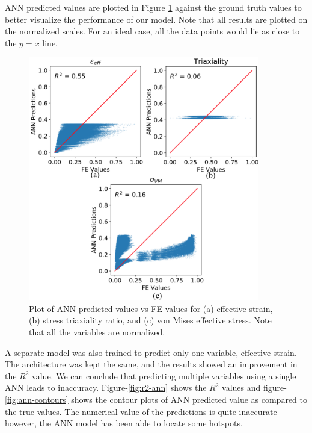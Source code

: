 ANN predicted values are plotted in Figure \ref{fig:exp_pred_ann} against the ground truth values to better visualize the performance of our model. Note that all results are plotted on the normalized scales. For an ideal case, all the data points would lie as close to the $y=x$ line.
\begin{figure}[!h]
	\centering
	\includegraphics[width=0.9\textwidth]{Pictures/ann-res/final-ann-bitmap.png}
	\hspace{1mm}
	\caption{Plot of ANN predicted values vs FE values for (a) effective strain, (b) stress triaxiality ratio, and (c) von Mises effective stress. Note that all the variables are normalized.} 
	\label{fig:exp_pred_ann}
\end{figure}
A separate model was also trained to predict only one variable, effective strain. The architecture was kept the same, and the results showed an improvement in the $R^2$ value. We can conclude that predicting multiple variables using a single ANN leads to inaccuracy. Figure-\ref{fig:r2-ann} shows the $R^2$ values and figure-\ref{fig:ann-contours} shows the contour plots of ANN predicted value as compared to the true values. The numerical value of the predictions is quite inaccurate however, the ANN model has been able to locate some hotspots. 
